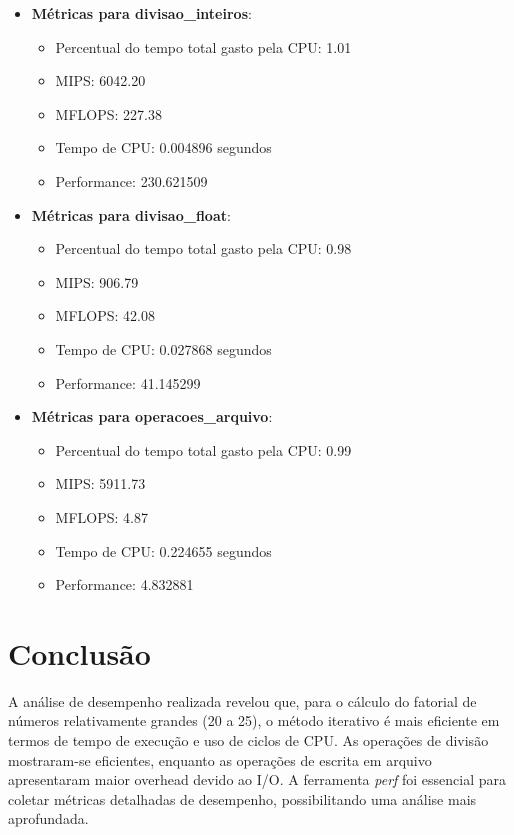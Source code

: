 \documentclass[12pt]{article}
\begin{document}
\begin{itemize}
    \item \textbf{Métricas para divisao\_inteiros}:
    \begin{itemize}
        \item Percentual do tempo total gasto pela CPU: 1.01
        \item MIPS: 6042.20
        \item MFLOPS: 227.38
        \item Tempo de CPU: 0.004896 segundos
        \item Performance: 230.621509
    \end{itemize}

    \item \textbf{Métricas para divisao\_float}:
    \begin{itemize}
        \item Percentual do tempo total gasto pela CPU: 0.98
        \item MIPS: 906.79
        \item MFLOPS: 42.08
        \item Tempo de CPU: 0.027868 segundos
        \item Performance: 41.145299
    \end{itemize}

    \item \textbf{Métricas para operacoes\_arquivo}:
    \begin{itemize}
        \item Percentual do tempo total gasto pela CPU: 0.99
        \item MIPS: 5911.73
        \item MFLOPS: 4.87
        \item Tempo de CPU: 0.224655 segundos
        \item Performance: 4.832881
    \end{itemize}
\end{itemize}

\newpage

\section{Conclusão}
A análise de desempenho realizada revelou que, para o cálculo do fatorial de números relativamente grandes (20 a 25), o método iterativo é mais eficiente em termos de tempo de execução e uso de ciclos de CPU. As operações de divisão mostraram-se eficientes, enquanto as operações de escrita em arquivo apresentaram maior overhead devido ao I/O. A ferramenta \textit{perf} foi essencial para coletar métricas detalhadas de desempenho, possibilitando uma análise mais aprofundada.
\end{document}
